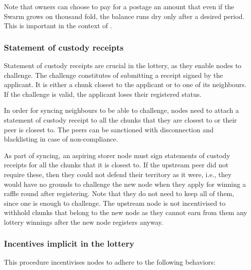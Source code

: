 Note that owners can choose to pay for a postage an amount that even if  the Swarm grows on thousand fold, the balance runs dry only after a desired period. This is important in the context of .






\subsubsection{Statement of custody receipts}

Statement of custody receipts are crucial in the lottery, as they enable nodes to challenge. The challenge constitutes of submitting a receipt signed by the applicant. It is either a chunk closest to the applicant or to one of its neighbours. If the challenge is valid, the applicant loses their registered status. 

In order for syncing neighbours to be able to challenge, nodes need to attach a statement of custody receipt to all the chunks that they are closest to or their peer is closest to. The peers can be sanctioned with disconnection and blacklisting in case of non-compliance. 

As part of syncing, an aspiring storer node must sign statements of custody receipts for all the chunks that it is closest to. If the upstream peer did not require these, then they could not defend their territory as it were, i.e., they would have no grounds to challenge the new node when they apply for winning a raffle round after registering. Note that they do not need to keep all of them, since one is enough to challenge. The upstream node is not incentivised to withhold chunks that belong to the new node as they cannot earn from them any lottery winnings after the new node registers anyway. 

\subsubsection{Incentives implicit in the lottery}

This procedure incentivises nodes to adhere to the following behaviors:

